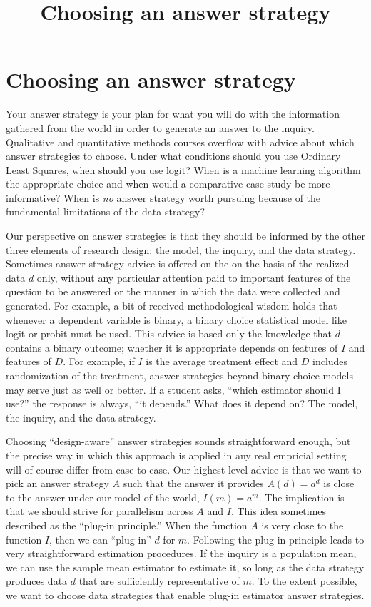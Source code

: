 \documentclass[
]{article}
\title{Choosing an answer strategy}
\author{}
\date{\vspace{-2.5em}}
\begin{document}
\maketitle

{
\setcounter{tocdepth}{4}
\tableofcontents
}
\hypertarget{choosing-an-answer-strategy}{%
\section{Choosing an answer
strategy}\label{choosing-an-answer-strategy}}

Your answer strategy is your plan for what you will do with the
information gathered from the world in order to generate an answer to
the inquiry. Qualitative and quantitative methods courses overflow with
advice about which answer strategies to choose. Under what conditions
should you use Ordinary Least Squares, when should you use logit? When
is a machine learning algorithm the appropriate choice and when would a
comparative case study be more informative? When is \emph{no} answer
strategy worth pursuing because of the fundamental limitations of the
data strategy?

Our perspective on answer strategies is that they should be informed by
the other three elements of research design: the model, the inquiry, and
the data strategy. Sometimes answer strategy advice is offered on the on
the basis of the realized data \(d\) only, without any particular
attention paid to important features of the question to be answered or
the manner in which the data were collected and generated. For example,
a bit of received methodological wisdom holds that whenever a dependent
variable is binary, a binary choice statistical model like logit or
probit must be used. This advice is based only the knowledge that \(d\)
contains a binary outcome; whether it is appropriate depends on features
of \(I\) and features of \(D\). For example, if \(I\) is the average
treatment effect and \(D\) includes randomization of the treatment,
answer strategies beyond binary choice models may serve just as well or
better. If a student asks, ``which estimator should I use?'' the
response is always, ``it depends.'' What does it depend on? The model,
the inquiry, and the data strategy.

Choosing ``design-aware'' answer strategies sounds straightforward
enough, but the precise way in which this approach is applied in any
real empricial setting will of course differ from case to case. Our
highest-level advice is that we want to pick an answer strategy \(A\)
such that the answer it provides \(A(d) = a^d\) is close to the answer
under our model of the world, \(I(m) = a^m\). The implication is that we
should strive for parallelism across \(A\) and \(I\). This idea
sometimes described as the ``plug-in principle.'' When the function
\(A\) is very close to the function \(I\), then we can ``plug in'' \(d\)
for \(m\). Following the plug-in principle leads to very straightforward
estimation procedures. If the inquiry is a population mean, we can use
the sample mean estimator to estimate it, so long as the data strategy
produces data \(d\) that are sufficiently representative of \(m\). To
the extent possible, we want to choose data strategies that enable
plug-in estimator answer strategies.
\end{document}
